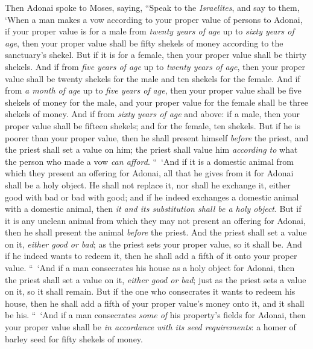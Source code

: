 \begin{biblechapter} %
 Then Adonai spoke to Moses, saying,
\verse “Speak to the \textit{Israelites}, and say to them, ‘When a man makes a vow according to your proper value of persons to Adonai,
\verse if your proper value is for a male from \textit{twenty years of age} up to \textit{sixty years of age}, then your proper value shall be fifty shekels of money according to the sanctuary’s shekel.
\verse But if it is for a female, then your proper value shall be thirty shekels.
\verse And if from \textit{five years of age} up to \textit{twenty years of age}, then your proper value shall be twenty shekels for the male and ten shekels for the female.
\verse And if from \textit{a month of age} up to \textit{five years of age}, then your proper value shall be five shekels of money for the male, and your proper value for the female shall be three shekels of money.
\verse And if from \textit{sixty years of age} and above: if a male, then your proper value shall be fifteen shekels; and for the female, ten shekels.
\verse But if he is poorer than your proper value, then he shall present himself \textit{before} the priest, and the priest shall set a value on him; the priest shall value him \textit{according to} what the person who made a vow \textit{can afford}.
\verse “ ‘And if it is a domestic animal from which they present an offering for Adonai, all that he gives from it for Adonai shall be a holy object.
\verse He shall not replace it, nor shall he exchange it, either good with bad or bad with good; and if he indeed exchanges a domestic animal with a domestic animal, then \textit{it and its substitution shall be a holy object}.
\verse But if it is any unclean animal from which they may not present an offering for Adonai, then he shall present the animal \textit{before} the priest.
\verse And the priest shall set a value on it, \textit{either good or bad}; as the priest sets your proper value, so it shall be.
\verse And if he indeed wants to redeem it, then he shall add a fifth of it onto your proper value.
\verse “ ‘And if a man consecrates his house as a holy object for Adonai, then the priest shall set a value on it, \textit{either good or bad}; just as the priest sets a value on it, so it shall remain.
\verse But if the one who consecrates it wants to redeem his house, then he shall add a fifth of your proper value’s money onto it, and it shall be his.
\verse “ ‘And if a man consecrates \textit{some of} his property’s fields for Adonai, then your proper value shall be \textit{in accordance with its seed requirements}: a homer of barley seed for fifty shekels of money.

\end{biblechapter}
